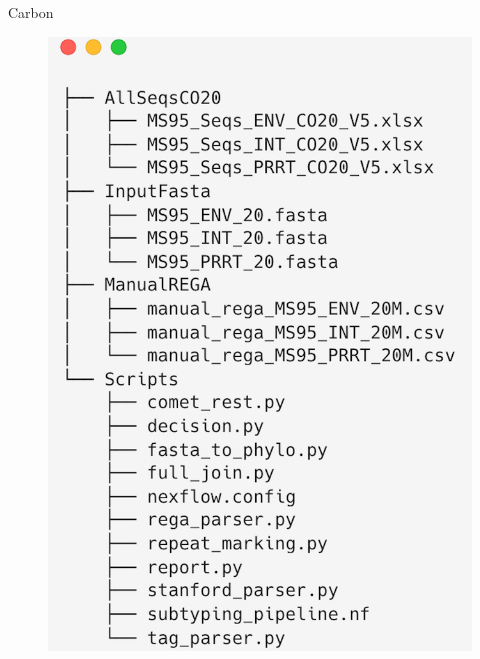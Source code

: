 \documentclass{beamer}
\begin{document}
\begin{frame}[t]{Carbon} 
\vspace{4pt}
\begin{figure}
\includegraphics[scale=0.2]{tree.png}
\end{figure}
\end{frame}
\end{document}
